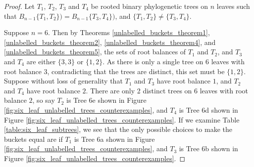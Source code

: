 \documentclass[12pt]{article}
\theoremstyle{definition}
\begin{document}
\begin{proof}
    Let $T_1$, $T_2$, $T_3$ and $T_4$ be rooted binary phylogenetic trees on $n$ leaves such that $B_{n-1}\{T_1, T_2\}) = B_{n-1}\{T_3, T_4\})$, and $\{T_1, T_2\} \neq \{T_3, T_4\}$.
    
    Suppose $n=6$. Then by Theorems \ref{unlabelled_buckets_theorem1}, \ref{unlabelled_buckets_theorem2}, \ref{unlabelled_buckets_theorem4}, and \ref{unlabelled_buckets_theorem5}, the sets of root balances of $T_1$ and $T_2$, and $T_3$ and $T_4$ are either $\{3, 3\}$ or $\{1, 2\}$. As there is only a single tree on 6 leaves with root balance $3$, contradicting that the trees are distinct, this set must be $\{1, 2\}$. Suppose without loss of generality that $T_1$ and $T_3$ have root balance $1$, and $T_2$ and $T_4$ have root balance $2$. There are only 2 distinct trees on 6 leaves with root balance $2$, so say $T_2$ is Tree 6e shown in Figure \ref{fig:six_leaf_unlabelled_trees_counterexamples}, and $T_4$ is Tree 6d shown in Figure \ref{fig:six_leaf_unlabelled_trees_counterexamples}. If we examine Table \ref{table:six_leaf_subtrees}, we see that the only possible choices to make the buckets equal are if $T_1$ is Tree 6a shown in Figure \ref{fig:six_leaf_unlabelled_trees_counterexamples}, and $T_3$ is Tree 6b shown in Figure \ref{fig:six_leaf_unlabelled_trees_counterexamples}.

\end{proof}
\end{document}
